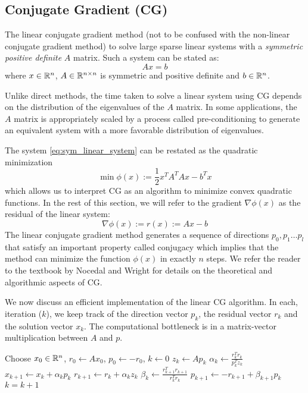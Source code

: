 \subsection{Conjugate Gradient (CG)}
The linear conjugate gradient method (not to be confused with the non-linear
conjugate gradient method) to solve large sparse linear systems with a
{\it symmetric positive definite} $A$ matrix. Such a system can be stated as:
\begin{equation}
  \label{eq:sym_linear_system}
  Ax = b
\end{equation}
where $x \in \mathbb{R}^{n}$, $A \in \mathbb{R}^{n \times n}$ is symmetric and positive
definite and $b \in \mathbb{R}^{n}$.

Unlike direct methods, the time taken to solve a linear system using CG depends on the
distribution of the eigenvalues of the $A$ matrix. In some applications,
the $A$ matrix is appropriately scaled by a process called pre-conditioning to
generate an equivalent system with a more favorable distribution of eigenvalues.


The system \eqref{eq:sym_linear_system} can be restated as the quadratic minimization
$$
  \min \phi(x) := \frac{1}{2} x^T A^T A x - b^T x
$$
which allows us to interpret CG as an algorithm to minimize convex quadratic
functions. In the rest of this section, we will refer to the gradient $\nabla \phi(x)$
as the residual of the linear system:
$$
  \nabla \phi(x) := r(x) := Ax - b
$$
The linear conjugate gradient method generates a sequence of directions ${p_0, p_1 \ldots p_l}$
that satisfy an important property called conjugacy which implies that the method
can minimize the function $\phi(x)$ in exactly $n$ steps. We refer the reader
to the textbook by Nocedal and Wright \cite{nocedal2006numerical} for details on the
theoretical and algorithmic aspects of CG.

We now discuss an efficient implementation of the linear CG algorithm. In each,
iteration ($k$), we keep track of the direction vector $p_k$, the residual
vector $r_k$ and the solution vector $x_k$. The computational bottleneck
is in a matrix-vector multiplication between $A$ and $p$.

\begin{algorithm}%
\begin{algorithmic}[1]
  \State Choose $x_0 \in \mathbb{R}^n$, $r_0 \leftarrow Ax_0$, $p_0 \leftarrow -r_0$, $k \leftarrow 0$
    \State$z_k \leftarrow Ap_k$
    \State$\alpha_k \leftarrow \frac{r_k^T r_k}{p_k^T z_k}$
    \State$x_{k+1} \leftarrow x_k + \alpha_k p_k$
    \State$r_{k+1} \leftarrow r_k + \alpha_k z_k$
    \State$\beta_k \leftarrow \frac{r_{k+1}^T r_{k+1}}{r_k^T r_k}$
    \State$p_{k+1} \leftarrow -r_{k+1} + \beta_{k+1} p_k$
    \State$k = k + 1$
  \EndWhile
\end{algorithmic}
\label{alg:cg}
\end{algorithm}

